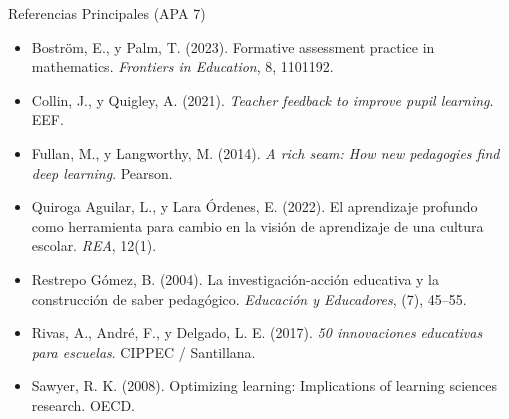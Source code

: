 \documentclass[aspectratio=169,spanish,xcolor=table]{beamer}
\begin{document}
\begin{frame}{Referencias Principales (APA 7)}
  \scriptsize\setlength{\parskip}{5pt}
  \begin{itemize}
    \item Boström, E., y Palm, T. (2023). Formative assessment practice in mathematics. \textit{Frontiers in Education}, 8, 1101192.
    \item Collin, J., y Quigley, A. (2021). \textit{Teacher feedback to improve pupil learning}. EEF.
    \item Fullan, M., y Langworthy, M. (2014). \textit{A rich seam: How new pedagogies find deep learning}. Pearson.
    \item Quiroga Aguilar, L., y Lara Órdenes, E. (2022). El aprendizaje profundo como herramienta para cambio en la visión de aprendizaje de una cultura escolar. \textit{REA}, 12(1).
    \item Restrepo Gómez, B. (2004). La investigación-acción educativa y la construcción de saber pedagógico. \textit{Educación y Educadores}, (7), 45--55.
    \item Rivas, A., André, F., y Delgado, L. E. (2017). \textit{50 innovaciones educativas para escuelas}. CIPPEC / Santillana.
    \item Sawyer, R. K. (2008). Optimizing learning: Implications of learning sciences research. OECD.
  \end{itemize}
\end{frame}
\end{document}
